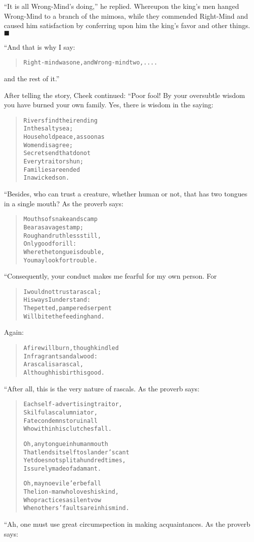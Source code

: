 \documentclass[article, twoside, 14pt]{memoir}
\newcommand{\qed}{\hfill \ensuremath{\blacksquare}}
\renewenvironment{verbatim}{%
\begin{quote}%
\vskip -10pt%
\begin{alltt}\normalfont\large}{\end{alltt}%
\end{quote}%
\vskip -10pt
} %
\begin{document}
``It is all Wrong-Mind's doing,'' he replied. Whereupon the king's
men hanged Wrong-Mind to a branch of the mimosa, while they
commended Right-Mind and caused him satisfaction by conferring upon
him the king's favor and other things.\hyperref[s29]{\qed}

“And that is why I say:

\begin{verbatim}
Right-mind was one, and Wrong-mind two, ....
\end{verbatim}
and the rest of it.”

After telling the story, Cheek continued: “Poor fool! By your
oversubtle wisdom you have burned your own family. Yes, there is
wisdom in the saying:

\begin{verbatim}
Rivers find their ending
    In the salty sea;
Household peace, as soon as
    Women disagree;
Secrets end that do not
    Every traitor shun;
Families are ended
    In a wicked son.
\end{verbatim}
“Besides, who can trust a creature, whether human or not, that has
two tongues in a single mouth? As the proverb says:

\begin{verbatim}
Mouths of snake and scamp
Bear a savage stamp;
Rough and ruthless still,
Only good for ill:
Where the tongue is double,
You may look for trouble.
\end{verbatim}
“Consequently, your conduct makes me fearful for my own person.
For

\begin{verbatim}
I would not trust a rascal;
    His ways I understand:
The petted, pampered serpent
    Will bite the feeding hand.
\end{verbatim}
Again:

\begin{verbatim}
A fire will burn, though kindled
    In fragrant sandalwood:
A rascal is a rascal,
    Although his birth is good.
\end{verbatim}
“After all, this is the very nature of rascals. As the proverb
says:

\begin{verbatim}
Each self-advertising traitor,
Skilful as calumniator,
Fate condemns to ruin all
Who within his clutches fall.

Oh, any tongue in human mouth
    That lends itself to slander's cant
Yet does not split a hundred times,
    Is surely made of adamant.

Oh, may no evil e'er befall
    The lion-man who loves his kind,
Who practices a silent vow
    When others' faults are in his mind.
\end{verbatim}
“Ah, one must use great circumspection in making acquaintances. As
the proverb says:
\end{document}
